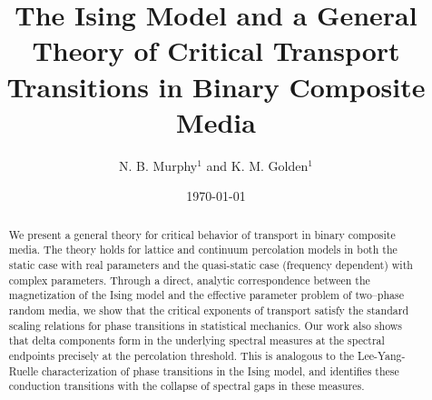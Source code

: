 \documentclass[english,12pt,jmp,graphicx]{revtex4-1}
\begin{document}

\title{The Ising Model and a General Theory of Critical Transport
  Transitions in Binary Composite Media} %



\author{N. B. Murphy$^1$ and K. M. Golden$^1$}
%


\date{\today}

\begin{abstract}
%
We present a general theory for critical behavior of transport 
in binary composite media. The theory holds for lattice and
continuum percolation models in both the static case with
real parameters and the 
quasi-static case (frequency dependent) with complex parameters.
Through a direct, analytic correspondence between the 
magnetization of the Ising model and
the effective parameter problem of two--phase random media, 
we show that the critical exponents of
transport satisfy the standard scaling relations for 
phase transitions in statistical mechanics. Our work
also shows that delta components form in the underlying 
spectral measures at the spectral endpoints
precisely at the percolation threshold. This is analogous 
to the Lee-Yang-Ruelle characterization of
phase transitions in the Ising model, and identifies these 
conduction transitions with the collapse of
spectral gaps in these measures. 
%
\end{abstract}
\end{document}
